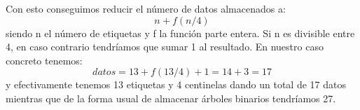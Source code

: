 \documentclass{article}
\begin{document}
\begin{flushleft}
  \vspace{\baselineskip}
  Con esto conseguimos reducir el número de datos almacenados a:
    $$ n + f(n/4) $$
  siendo n el número de etiquetas y f la función parte entera. Si n es divisible entre 4,
  en caso contrario tendríamos que sumar 1 al resultado. \break
  En nuestro caso concreto tenemos:
    $$ datos = 13 + f(13/4) + 1 = 14 + 3 = 17 $$
  y efectivamente tenemos 13 etiquetas y 4 centinelas dando un total de 17 datos mientras que
  de la forma usual de almacenar árboles binarios tendríamos 27.
\end{flushleft}
\end{document}
